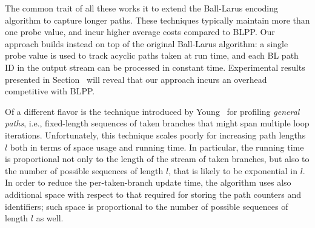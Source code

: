 The common trait of all these works it to extend the Ball-Larus encoding algorithm to capture longer paths. These techniques typically maintain more than one probe value, and incur higher average costs compared to BLPP. Our approach builds instead on top of the original Ball-Larus algorithm: a single probe value is used to track acyclic paths taken at run time, and each BL path ID in the output stream can be processed in constant time. Experimental results presented in Section \missing\ will reveal that our approach incurs an overhead competitive with BLPP.


Of a different flavor is the technique introduced by Young~\cite{Young98} for profiling {\em general paths}, i.e., fixed-length sequences of taken branches that might span multiple loop iterations.
Unfortunately, this technique scales poorly for increasing path lengths $l$ both in terms of space usage and running time. In particular, the running time is proportional not only to the length of the stream of taken branches, but also to the number of possible sequences of length $l$, that is likely to be exponential in $l$. In order to reduce the per-taken-branch update time, the algorithm uses also additional space with respect to that required for storing the path counters and identifiers; such space is proportional to the number of possible sequences of length $l$ as well.